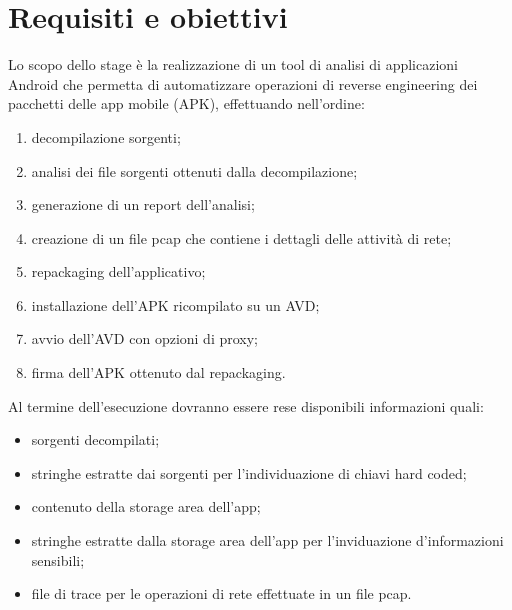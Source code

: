 
\section{Requisiti e obiettivi}\label{sec:requisiti-e-obiettivi}
Lo scopo dello stage è la realizzazione di un tool di analisi di applicazioni Android che permetta di automatizzare operazioni di reverse engineering dei pacchetti delle app mobile (APK), effettuando nell'ordine:
\begin{enumerate}
    \setlength\itemsep{0.1em}
    \item decompilazione sorgenti;
    \item analisi dei file sorgenti ottenuti dalla decompilazione;
    \item generazione di un report dell'analisi;
    \item creazione di un file \gls{pcap} che contiene i dettagli delle attività di rete;
    \item repackaging dell'applicativo;
    \item installazione dell'APK ricompilato su un AVD;
    \item avvio dell'AVD con opzioni di proxy;
    \item firma dell'APK ottenuto dal repackaging.
\end{enumerate}
Al termine dell'esecuzione dovranno essere rese disponibili informazioni quali:
\begin{itemize}
    \setlength\itemsep{0.1em}
    \item sorgenti decompilati;
    \item stringhe estratte dai sorgenti per l'individuazione di chiavi hard coded;
    \item contenuto della storage area dell'app;
    \item stringhe estratte dalla storage area dell'app per l'inviduazione d'informazioni sensibili;
    \item file di trace per le operazioni di rete effettuate in un file pcap.
\end{itemize}

